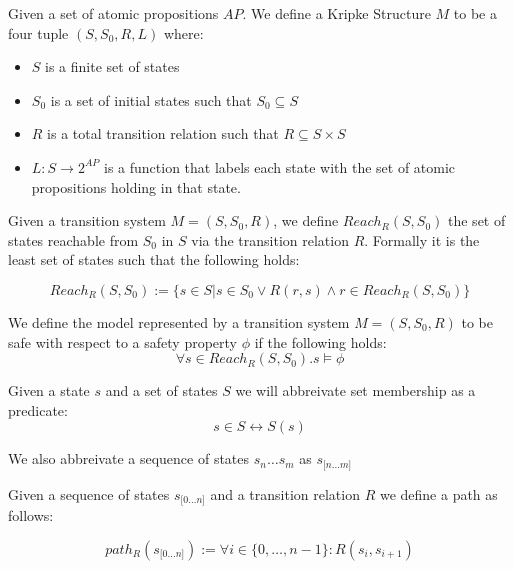 \begin{mydef}
Given a set of atomic propositions $AP$. We define a Kripke Structure $M$ to be a four tuple $(S, S_0, R, L)$
where:
\begin{itemize} 
\item $S$ is a finite set of states
\item $S_0$ is a set of initial states such that $S_0 \subseteq S$
\item $R$ is a total transition relation such that $R \subseteq S \times S$
\item $L: S \to 2^{AP}$ is a function that labels each state with the set of atomic propositions holding in that state.
\end{itemize}
\end{mydef}




\begin{mydef}[Reachability]
Given a transition system $M = (S,S_0, R)$, we define $Reach_R(S, S_0)$ the set of states reachable from $S_0$ in $S$ via the transition relation $R$. Formally it is the least set of states such that the following holds: 

$$ Reach_R(S,S_0) := \{s \in S | s \in S_0 \vee R(r,s) \wedge r \in Reach_R(S,S_0)\} $$

\end{mydef}

\begin{mydef}
We define the model represented by a transition system $M = (S,S_0, R)$ to be safe with respect to a safety property $\phi$ if the following holds:
$$\forall s \in Reach_R(S,S_0). s \models \phi $$

\end{mydef}

\newcommand{\sseq}[2]{s_{{[}#1 \ldots #2 {]}} }

\begin{myremark}
Given a state $s$ and a set of states $S$ we will abbreivate set membership as a predicate:
 $$s \in S \leftrightarrow S(s)$$

We also  abbreivate  a sequence of states $s_n \ldots s_m$ as $\sseq{n}{m}$

\end{myremark}


\begin{mydef}[Path]
Given a sequence of states $\sseq{0}{n}$ and a transition relation $R$ we define a path as follows:
 
$$path_R(\sseq{0}{n})  := \forall i \in \{0, \ldots, n-1 \} : R(s_i, s_{i+1})$$


\end{mydef}

